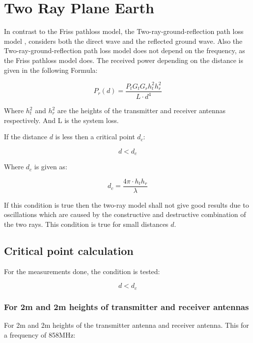 \section{Two Ray Plane Earth}
In contrast to the Friss pathloss model, the Two-ray-ground-reflection path loss model \citep{two_ray}, considers both the direct wave and the reflected ground wave. Also the Two-ray-ground-reflection path loss model does not depend on the frequency, as the Friss pathloss model does. The received power depending on the distance is given in the following Formula:

\begin{equation}
P_r(d) = \frac{P_t G_t G_r h^2_t h^2_r}{L \cdot d^4}
\label{two_ray_model}
\end{equation}

Where $h^2_t$ and $h^2_r$ are the heights of the transmitter and receiver antennas respectively. And L is the system loss. 

If the distance $d$ is less then a critical point $d_{c}$: 

\begin{equation}
d<d_{c}
\label{two_ray_cond}
\end{equation}

Where $d_{c}$ is given as:

\begin{equation}
d_{c} = \frac{4\pi \cdot h_t h_r}{\lambda}
\label{critical_fac_dc}
\end{equation}

If this condition is true then the two-ray model shall not give good results due to oscillations which are caused by the constructive and destructive combination of the two rays. This condition is true for small distances $d$.

\subsection{Critical point calculation}
For the measurements done, the condition is tested:

\begin{equation}
d<d_{c}
\label{two_ray_cond_1}
\end{equation}

\subsubsection{For 2m and 2m heights of transmitter and receiver antennas}

For 2m and 2m heights of the transmitter antenna and receiver antenna. This for a frequency of 858MHz:

